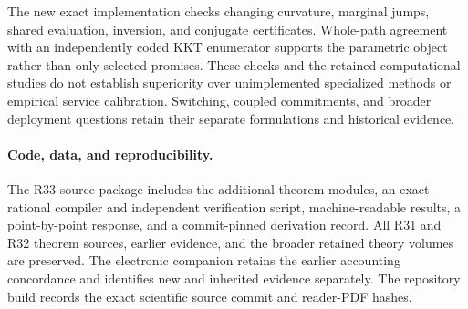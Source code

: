 \documentclass[11pt,letterpaper]{article}
\theoremstyle{definition}\newtheorem{assumption}[theorem]{Assumption}
\begin{document}
The new exact implementation checks changing curvature, marginal jumps, shared evaluation, inversion, and conjugate certificates. Whole-path agreement with an independently coded KKT enumerator supports the parametric object rather than only selected promises. These checks and the retained computational studies do not establish superiority over unimplemented specialized methods or empirical service calibration. Switching, coupled commitments, and broader deployment questions retain their separate formulations and historical evidence.

\paragraph{Code, data, and reproducibility.}
The R33 source package includes the additional theorem modules, an exact rational compiler and independent verification script, machine-readable results, a point-by-point response, and a commit-pinned derivation record. All R31 and R32 theorem sources, earlier evidence, and the broader retained theory volumes are preserved. The electronic companion retains the earlier accounting concordance and identifies new and inherited evidence separately. The repository build records the exact scientific source commit and reader-PDF hashes.

\clearpage


\end{document}
